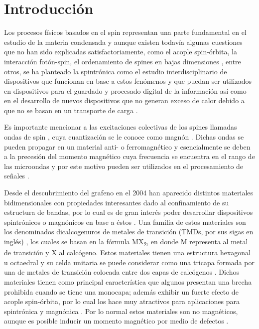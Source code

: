 \chapter*{Introducci\'on}
Los procesos físicos basados en el spin representan una parte fundamental en el estudio de la materia condensada y aunque existen todav\'ia algunas cuestiones que no han sido explicadas satisfactoriamente, como el acople spin-\'orbita, la interacci\'on fot\'on-spin, el ordenamiento de spines en bajas dimensiones \cite{spin-2016}, entre otros, se ha planteado la spintr\'onica como el estudio interdisciplinario de dispositivos que funcionan en base a estos fen\'omenos y que puedan ser utilizados en dispositivos para el guardado y procesado digital de la informaci\'on as\'i como en el desarrollo de nuevos dispositivos que no generan exceso de calor  debido a que no se basan en un transporte de carga \cite{spintronics-2016}.
\newline
\par Es importante mencionar a las excitaciones  colectivas de los spines llamadas ondas de spin \cite{spinW-2009}, cuya cuantizaci\'on se le conoce como magn\'on \cite{magnon-2020}. Dichas ondas se pueden propagar en  un material anti- o ferromagn\'etico y esencialmente se deben a la precesi\'on  del momento magn\'etico cuya frecuencia se encuentra en el rango de las microondas  y por este motivo pueden ser utilizados en el procesamiento de se\~nales \cite{magnon-2020}.
\newline
\par Desde el descubrimiento del grafeno en el 2004 \cite{grap-2005} han aparecido distintos materiales bidimensionales con propiedades interesantes dado al confinamiento de su estructura de bandas, por lo cual es de gran inter\'es poder desarrollar dispositivos spintr\'onicos o magn\'onicos en base a \'estos \cite{spin-2016}. Una familia de estos materiales son los denominados dicalcogenuros de metales de transici\'on  (TMDs, por sus sigas en ingl\'es) \cite{tmds-2013}, los cuales se basan en la f\'ormula MX\textsubscript{2}, en donde M representa al metal de transici\'on y X al calc\'ogeno. Estos materiales tienen una estructura hexagonal  u octaedral y su celda unitaria se puede considerar como una tricapa formada por una de metales de transici\'on colocada entre dos capas de calc\'ogenos \cite{tmds-2013}. Dichos materiales tienen como principal caracter\'istica que algunos presentan una brecha prohibida cuando se tiene una monocapa; adem\'as  exhibir un fuerte  efecto de acople spin-\'orbita, por lo cual los hace muy atractivos para aplicaciones para spintr\'onica y magn\'onica \cite{tmds-2016, spin-2016}. Por lo normal estos materiales son no magn\'eticos, aunque es posible inducir un momento magn\'etico por medio de  defectos \cite{tmds-2016}.
